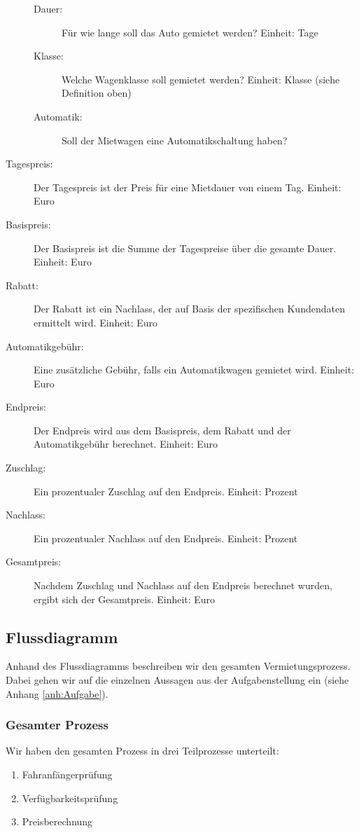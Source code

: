 \begin{description}
\begin{description}
			\item[Dauer:] Für wie lange soll das Auto gemietet werden? Einheit: Tage
			\item[Klasse:] Welche Wagenklasse soll gemietet werden? Einheit: Klasse (siehe Definition oben)
			\item[Automatik:] Soll der Mietwagen eine Automatikschaltung haben?
		\end{description}
	\item[Tagespreis:] Der Tagespreis ist der Preis für eine Mietdauer von einem Tag. Einheit: Euro
	\item[Basispreis:] Der Basispreis ist die Summe der Tagespreise über die gesamte Dauer. Einheit: Euro
	\item[Rabatt:] Der Rabatt ist ein Nachlass, der auf Basis der spezifischen Kundendaten ermittelt wird. Einheit: Euro
	\item[Automatikgebühr:] Eine zusätzliche Gebühr, falls ein Automatikwagen gemietet wird. Einheit: Euro
	\item[Endpreis:] Der Endpreis wird aus dem Basispreis, dem Rabatt und der Automatikgebühr berechnet. Einheit: Euro
	\item[Zuschlag:] Ein prozentualer Zuschlag auf den Endpreis. Einheit: Prozent
	\item[Nachlass:] Ein prozentualer Nachlass auf den Endpreis. Einheit: Prozent
	\item[Gesamtpreis:] Nachdem Zuschlag und Nachlass auf den Endpreis berechnet wurden, ergibt sich der Gesamtpreis. Einheit: Euro
	
\end{description}

\subsection{Flussdiagramm}

Anhand des Flussdiagramms beschreiben wir den gesamten Vermietungsprozess. Dabei gehen wir auf
die einzelnen Aussagen aus der Aufgabenstellung ein (siehe Anhang \ref{anh:Aufgabe}).

\subsubsection{Gesamter Prozess}

Wir haben den gesamten Prozess in drei Teilprozesse unterteilt:
\begin{enumerate}
	\item Fahranfängerprüfung
	\item Verfügbarkeitsprüfung
	\item Preisberechnung
\end{enumerate}

